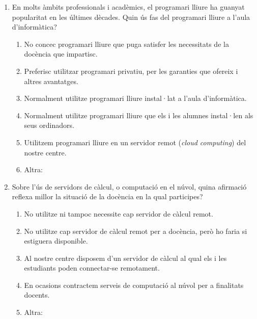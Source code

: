 \documentclass[a4paper,12pt]{article}
\begin{document}
\begin{enumerate}
\item En molts àmbits professionals i acadèmics, el programari lliure ha guanyat popularitat
en les últimes dècades. Quin ús fas del programari lliure a l'aula d'informàtica?
   \begin{enumerate}
   \item No concec programari lliure que puga satisfer les necessitats de la docència que impartisc.
   \item Preferisc utilitzar programari privatiu, per les garanties que ofereix i altres avantatges.
   \item Normalment utilitze programari lliure instal·lat a l'aula d'informàtica.
   \item Normalment utilitze programari lliure que els i les alumnes instal·len als seus ordinadors.
   \item Utilitzem programari lliure en un servidor remot (\emph{cloud computing}) del nostre centre.
   \item Altra:
   \end{enumerate}

\item Sobre l'ús de servidors de càlcul, o computació en el núvol, quina afirmació reflexa
millor la situació de la docència en la qual participes?
   \begin{enumerate}
   \item No utilitze ni tampoc necessite cap servidor de càlcul remot.
   \item No utilitze cap servidor de càlcul remot per a docència, però ho faria si estiguera disponible.
   \item Al nostre centre disposem d'un servidor de càlcul al qual els i les estudiants poden connectar-se remotament.
   \item En ocasions contractem serveis de computació al núvol per a finalitats docents.
   \item Altra:
   \end{enumerate}


\end{enumerate}
\end{document}
